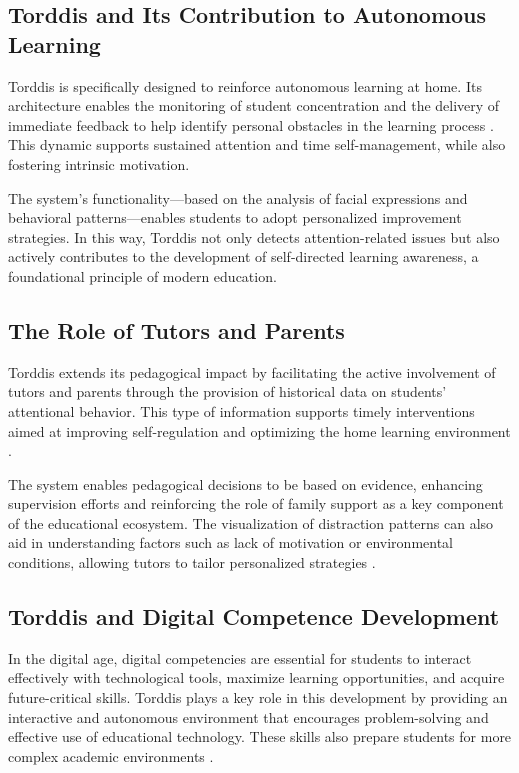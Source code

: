 		\subsection{Torddis and Its Contribution to Autonomous Learning}
			Torddis is specifically designed to reinforce autonomous learning at home. Its architecture enables the monitoring of student concentration and the delivery of immediate feedback to help identify personal obstacles in the learning process \citep{Li2024Systematic}. This dynamic supports sustained attention and time self-management, while also fostering intrinsic motivation.
			
			The system’s functionality—based on the analysis of facial expressions and behavioral patterns—enables students to adopt personalized improvement strategies. In this way, Torddis not only detects attention-related issues but also actively contributes to the development of self-directed learning awareness, a foundational principle of modern education.
			
		\subsection{The Role of Tutors and Parents}
			Torddis extends its pedagogical impact by facilitating the active involvement of tutors and parents through the provision of historical data on students’ attentional behavior. This type of information supports timely interventions aimed at improving self-regulation and optimizing the home learning environment \citep{Loh2025Plugging}.
			
			The system enables pedagogical decisions to be based on evidence, enhancing supervision efforts and reinforcing the role of family support as a key component of the educational ecosystem. The visualization of distraction patterns can also aid in understanding factors such as lack of motivation or environmental conditions, allowing tutors to tailor personalized strategies \citep{Navarro2024,Ackermans2025Young}.
			
		\subsection{Torddis and Digital Competence Development}
			In the digital age, digital competencies are essential for students to interact effectively with technological tools, maximize learning opportunities, and acquire future-critical skills. Torddis plays a key role in this development by providing an interactive and autonomous environment that encourages problem-solving and effective use of educational technology. These skills also prepare students for more complex academic environments \citep{Mohamed2018Implementing}.
			
